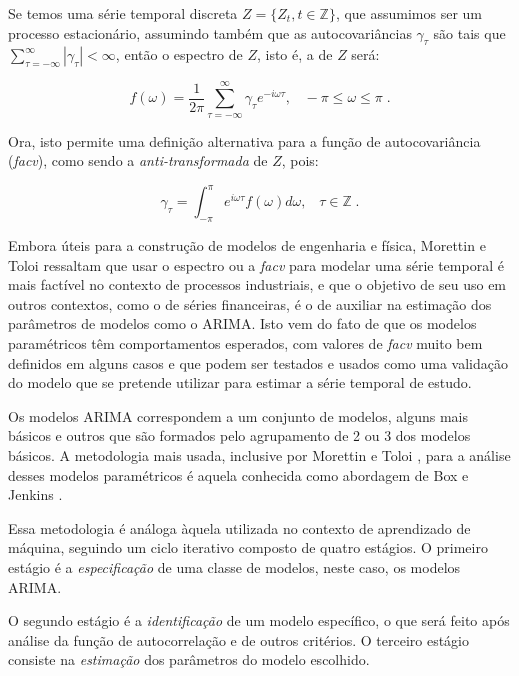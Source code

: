 Se temos uma série temporal discreta $Z = \{ Z_t, t \in \mathbb{Z} \}$, que assumimos ser um processo estacionário, assumindo também que as autocovariâncias $\gamma_\tau$ são tais que $\sum_{\tau=-\infty}^{\infty} |\gamma_\tau| < \infty$, então o espectro de $Z$, isto é, a  de $Z$ será:

\begin{equation}\label{series:2.33}
f(\omega) = \frac{1}{2\pi} \sum_{\tau=-\infty}^{\infty} \gamma_\tau e^{-i\omega\tau}, \;\;\; -\pi\leq\omega\leq\pi\;.
\end{equation}

Ora, isto permite uma definição alternativa para a função de autocovariância (\emph{facv}), como sendo a \emph{anti-transformada} de $Z$, pois:

\begin{equation}\label{series:2.34}
\gamma_\tau = \int_{-\pi}^{\pi} e^{i\omega\tau} f(\omega) d\omega, \;\;\; \tau \in \mathbb{Z}\;.
\end{equation}

Embora úteis para a construção de modelos de engenharia e física, Morettin e Toloi \citep{morettin} ressaltam que usar o espectro ou a \emph{facv} para modelar uma série temporal é mais factível no contexto de processos industriais, e que o objetivo de seu uso em outros contextos, como o de séries financeiras, é o de auxiliar na estimação dos parâmetros de modelos como o ARIMA. Isto vem do fato de que os modelos paramétricos têm comportamentos esperados, com valores de \emph{facv} muito bem definidos em alguns casos e que podem ser testados e usados como uma validação do modelo que se pretende utilizar para estimar a série temporal de estudo.

Os modelos ARIMA correspondem a um conjunto de modelos, alguns mais básicos e outros que são formados pelo agrupamento de 2 ou 3 dos modelos básicos. A metodologia mais usada, inclusive por Morettin e Toloi \citep{morettin}, para a análise desses modelos paramétricos é aquela conhecida como abordagem de Box e Jenkins \citep{box}.

Essa metodologia é análoga àquela utilizada no contexto de aprendizado de máquina, seguindo um ciclo iterativo composto de quatro estágios. O primeiro estágio é a \emph{especificação} de uma classe de modelos, neste caso, os modelos ARIMA.

O segundo estágio é a \emph{identificação} de um modelo específico, o  que será feito após análise da função de autocorrelação e de outros critérios. O terceiro estágio consiste na \emph{estimação} dos parâmetros do modelo escolhido.

